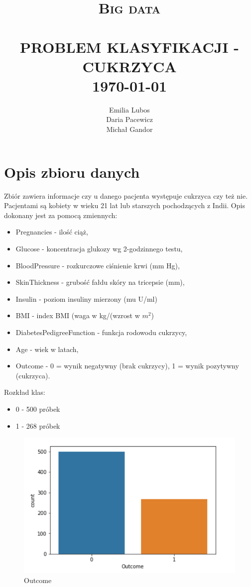 \documentclass[12pt]{article}
\title{	\normalsize \textsc{Big data} 	%
		 	\\[2.0cm]								%
			\HRule{0.5pt} \\						%
			\LARGE \textbf{\uppercase{Problem klasyfikacji - cukrzyca}}	%
			\HRule{2pt} \\ [0.5cm]		%
			\normalsize \today			%
		}
\author{
		Emilia Lubos\\
		Daria Pacewicz\\
		Michał Gandor\\		
}
\makeatletter
\def\printtitle{%
    {\centering \@title\par}}
\def\printauthor{%
    {\centering \large \@author}}
\makeatother
\begin{document}
\thispagestyle{empty}		%

\printtitle					%
  	\vfill
\printauthor				%
\section{Opis zbioru danych}

Zbiór zawiera informacje czy u danego pacjenta występuje cukrzyca czy też nie. Pacjentami są kobiety w wieku 21 lat lub starszych pochodzących z Indii. Opis dokonany jest za pomocą zmiennych:

\begin{itemize}
\item Pregnancies - ilość ciąż,
\item Glucose - koncentracja glukozy wg 2-godzinnego testu,
\item BloodPressure - rozkurczowe ciśnienie krwi (mm Hg),
\item SkinThickness - grubość fałdu skóry na tricepsie (mm),
\item Insulin - poziom insuliny mierzony (mu U/ml)
\item BMI - index BMI (waga w kg/(wzrost w $m^2$)
\item DiabetesPedigreeFunction - funkcja rodowodu cukrzycy,
\item Age - wiek w latach,
\item Outcome - 0 = wynik negatywny (brak cukrzycy), 1 = wynik pozytywny (cukrzyca).
\end{itemize}

Rozkład klas:

\begin{itemize}
\item 0 - 500 próbek
\item 1 - 268 próbek
\end{itemize}

\begin{figure}
	\centering
	\includegraphics{images/outcome.png}
	\caption{Outcome}
	\label{fig:outcome}
\end{figure}
\end{document}
